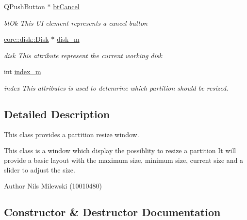 \begin{DoxyCompactItemize}
\mbox{\label{classui_1_1window_1_1_resize_partition_abe84d7ad5ed17041184f17f84e81ed55}} 
Q\+Push\+Button $\ast$ \mbox{\hyperlink{classui_1_1window_1_1_resize_partition_abe84d7ad5ed17041184f17f84e81ed55}{bt\+Cancel}}
\begin{DoxyCompactList}\small\item\em bt\+Ok This UI element represents a cancel button \end{DoxyCompactList}\item 
\mbox{\label{classui_1_1window_1_1_resize_partition_aa9f3a4abebf2444077705e49ddb3a237}} 
\mbox{\hyperlink{classcore_1_1disk_1_1_disk}{core\+::disk\+::\+Disk}} $\ast$ \mbox{\hyperlink{classui_1_1window_1_1_resize_partition_aa9f3a4abebf2444077705e49ddb3a237}{disk\+\_\+m}}
\begin{DoxyCompactList}\small\item\em disk This attribute represent the current working disk \end{DoxyCompactList}\item 
\mbox{\label{classui_1_1window_1_1_resize_partition_acde46a28e7bfbfb9750450719e8d8a65}} 
int \mbox{\hyperlink{classui_1_1window_1_1_resize_partition_acde46a28e7bfbfb9750450719e8d8a65}{index\+\_\+m}}
\begin{DoxyCompactList}\small\item\em index This attributes is used to detemrine which partition should be resized. \end{DoxyCompactList}\end{DoxyCompactItemize}


\subsection{Detailed Description}
This class provides a partition resize window. 

This class is a window which display the possiblity to resize a partition It will provide a basic layout with the maximum size, minimum size, current size and a slider to adjust the size. \begin{DoxyAuthor}{Author}
Nils Milewski (10010480) 
\end{DoxyAuthor}


\subsection{Constructor \& Destructor Documentation}
\mbox{\label{classui_1_1window_1_1_resize_partition_aae9713fef4f920cea006ca9552f02b82}} 

